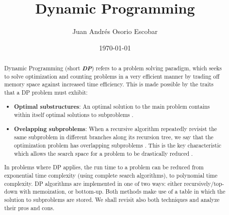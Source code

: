 \documentclass{article}
\begin{document}
\title{Dynamic Programming}
\author{Juan Andrés Osorio Escobar}
\date{\today}
\maketitle

\begin{abstract}
Dynamic Programming (short \textbf{\emph{DP}}) refers to a problem solving paradigm,
  which seeks to solve optimization and counting problems in a very efficient manner by 
  trading off memory space against increased time efficiency. This is made 
  possible by the traits that a DP problem must exhibit: 
  \begin{itemize}
    \item \textbf{Optimal substructures}: An optimal solution to the main problem contains within itself optimal solutions to subproblems \cite{cormen2009introduction}.
    \item \textbf{Ovelapping subproblems}: When a recursive algorithm repeatedly revisist the same subproblem in different branches along its recursion tree, we say that the optimization problem has overlapping subproblems \cite{cormen2009introduction}. This is the key characteristic
    which allows the search space for a problem to be drastically reduced \cite{halim2013competitive}.
  \end{itemize}
  
  In problems where DP applies, the run time to a problem can be reduced from exponential 
  time complexity (using complete search algorithms), to polynomial time complexity. DP algorithms are implemented
  in one of two ways: either recursively/top-down with memoization, or bottom-up. Both methods make use of a table in which the solution to subproblems are stored.
  We shall revisit also both techniques and analyze their pros and cons.


\end{abstract}
\end{document}

